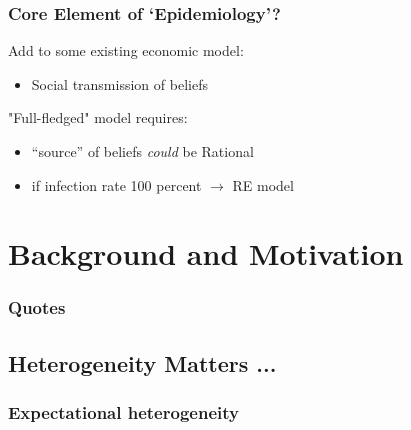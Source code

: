 \documentclass[pdflatex]{beamer}
\begin{document}
\begin{frame}
    \frametitle{Core Element of `Epidemiology'?}

Add to some existing economic model:
\pause
\begin{itemize}
    \item Social transmission of beliefs
\end{itemize}
\medskip\medskip


"Full-fledged" model requires:


\medskip\medskip
\pause
\begin{itemize}
    \item ``source'' of beliefs \emph{could} be Rational
    \item if infection rate 100 percent $\rightarrow$ RE model
\end{itemize}

\end{frame}

\section{Background and Motivation}\label{motivation-and-context}

\begin{frame}
	\frametitle{Quotes}

    \medskip



    \medskip\medskip
\end{frame}


\subsection{Heterogeneity Matters ... }\label{EpiExpHet}\hypertarget{EpiExpHet}{}

\begin{frame}
    \frametitle{Expectational heterogeneity}

    \medskip\medskip


\end{frame}
\end{document}
